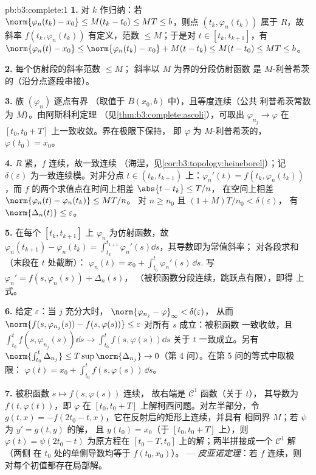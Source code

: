 \begin{solution}{pb:b3:complete:1}
\textbf{1.} 对 $k$ 作归纳：若 $\norm{\varphi_n(t_k) - x_0}
\leq M(t_k - t_0) \leq MT \leq b$，则点 $(t_k,
\varphi_n(t_k))$ 属于 $R$，故斜率 $f(t_k,
\varphi_n(t_k))$ 有定义，范数 $\leq M$；于是对 $t \in
[t_k, t_{k+1}]$，有 $\norm{\varphi_n(t) - x_0} \leq
\norm{\varphi_n(t_k) - x_0} + M(t - t_k) \leq M(t - t_0) \leq
MT \leq b$。

\textbf{2.} 每个仿射段的斜率范数 $\leq M$；
斜率以 $M$ 为界的分段仿射函数
是 $M$-利普希茨的（沿分点逐段串接）。

\textbf{3.} 族 $(\varphi_n)$ 逐点有界
（取值于 $\bar B(x_0, b)$ 中），且等度连续（公共
利普希茨常数为 $M$）。由阿斯科利定理
（见\cref{thm:b3:complete:ascoli}），可取出 $\varphi_{n_j} \to
\varphi$ 在 $[t_0, t_0 + T]$ 上一致收敛。界在极限下保持，
即 $\varphi$ 为 $M$-利普希茨的，$\varphi(t_0) = x_0$。

\textbf{4.} $R$ 紧，$f$ 连续，故一致连续
（海涅，见\cref{cor:b3:topology:heineborel}）；记
$\delta(\varepsilon)$ 为一致连续模。对非分点 $t \in (t_k,
t_{k+1})$ 上：$\varphi_n'(t) = f(t_k, \varphi_n(t_k))$，而
$f$ 的两个求值点在时间上相差 $\abs{t - t_k} \leq T/n$，
在空间上相差 $\norm{\varphi_n(t) - \varphi_n(t_k)} \leq MT/n$。
对 $n \geq n_0$ 且 $(1 + M)T/n_0 < \delta(\varepsilon)$，
有 $\norm{\Delta_n(t)} \leq \varepsilon$。

\textbf{5.} 在每个 $[t_k, t_{k+1}]$ 上 $\varphi_n$ 为仿射函数，故
$\varphi_n(t_{k+1}) - \varphi_n(t_k) = \int_{t_k}^{t_{k+1}}
\varphi_n'(s)\dd s$，其导数即为常值斜率；
对各段求和（末段在 $t$ 处截断）：
$\varphi_n(t) = x_0 + \int_{t_0}^t\varphi_n'(s)\,\dd s$.
写 $\varphi_n' = f(s, \varphi_n(s)) + \Delta_n(s)$，
（被积函数分段连续，跳跃点有限），即得
上式。

\textbf{6.} 给定 $\varepsilon$：当 $j$ 充分大时，
$\norm{\varphi_{n_j} - \varphi}_\infty < \delta(\varepsilon)$，
从而 $\norm{f(s, \varphi_{n_j}(s)) - f(s, \varphi(s))} \leq
\varepsilon$ 对所有 $s$ 成立：被积函数
一致收敛，且 $\int_{t_0}^t f(s,\varphi_{n_j}(s))\dd s \to
\int_{t_0}^tf(s, \varphi(s))\dd s$ 关于 $t$ 一致成立。另有
$\norm{\int_{t_0}^t\Delta_{n_j}} \leq T\sup\norm{\Delta_{n_j}}
\to 0$（第 4 问）。在第 5 问的等式中取极限：
$\varphi(t) = x_0 + \int_{t_0}^tf(s,
\varphi(s))\,\dd s$。

\textbf{7.} 被积函数 $s \mapsto f(s, \varphi(s))$ 连续，
故右端是 $\mathcal C^1$ 函数（关于 $t$），
其导数为 $f(t, \varphi(t))$，即 $\varphi$ 在
$[t_0, t_0 + T]$ 上解柯西问题。对左半部分，令 $g(t, x) =
-f(2t_0 - t, x)$，它在反射后的矩形上连续，并具有
相同界 $M$；若 $\psi$ 为 $y' = g(t,y)$ 的解，
且 $y(t_0) = x_0$（于 $[t_0, t_0 + T]$ 上），则 $\varphi(t) =
\psi(2t_0 - t)$ 为原方程在 $[t_0 - T,
t_0]$ 上的解；两半拼接成一个 $\mathcal C^1$ 解（两侧
在 $t_0$ 处的单侧导数均等于 $f(t_0, x_0)$）。 ---
\emph{皮亚诺定理}：若 $f$ 连续，则
对每个初值都存在局部解。


\end{solution}
